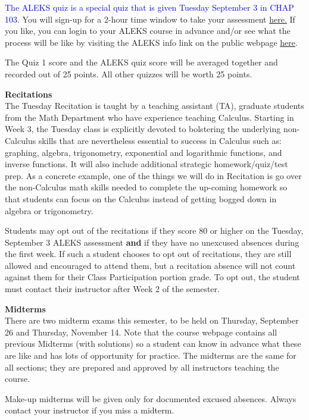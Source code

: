 \documentclass[12pt]{article}
\renewcommand{\emph}[1]{\textsf{\textbf{#1}}}
\newcommand{\localhead}[1]{\par\smallskip\textbf{#1}\nobreak\\}%
\def\heading#1{\localhead{\large\emph{#1}}}
\begin{document}
\textcolor{blue}{The ALEKS quiz is a special quiz that is given Tuesday September 3 in CHAP 103.} You will sign-up for a 2-hour time window to take your assessment \href{https://aleks-testing.youcanbook.me/}{here.} If you like, you can login to your ALEKS course in advance and/or see what the process will be like by visiting the ALEKS info link on the public webpage \href{https://uaf-math251.github.io/week1-ALEKS.html}{here}.

The Quiz 1 score and the ALEKS quiz score will be averaged together and recorded out of 25 points. All other quizzes will be worth 25 points.

\heading{Recitations}
The Tuesday Recitation is taught by a teaching assistant (TA), graduate students from the Math  Department who have experience teaching Calculus. Starting in Week 3, the Tuesday class is explicitly devoted to bolstering the underlying non-Calculus skills that are nevertheless essential to success in Calculus such as: graphing, algebra, trigonometry, exponential and logarithmic functions, and inverse functions. It will also include additional strategic homework/quiz/test prep. As a concrete example, one of the things we will do in Recitation is go over the non-Calculus math skills needed to complete the up-coming homework so that students can focus on the Calculus instead of getting bogged down in algebra or trigonometry.

Students may opt out of the recitations if they score 80 or higher on the Tuesday, September 3 ALEKS assessment \textbf{and} if they have no unexcused absences during the first week. If such a student chooses to opt out of recitations, they are still allowed and encouraged to attend them, but a recitation absence will not count against them for their Class Participation portion grade. To opt out, the student must contact their instructor after Week 2 of the semester.

\heading{Midterms}
There are two midterm exams this semester, to be held on Thursday, September 26 and Thursday, November 14. Note that the course webpage contains all previous Midterms (with solutions) so a student can know in advance what these are like and has lots of opportunity for practice. The midterms are the same 
for all sections; they are prepared and approved by all instructors teaching the course. 

Make-up midterms will be given only for documented excused absences. Always contact your instructor if you miss a midterm.

\pagebreak
\end{document}
